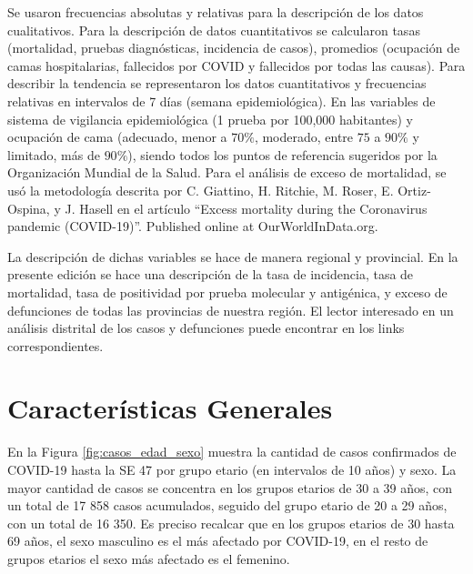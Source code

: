 \documentclass[12pt,a4paper,openany]{book}
\begin{document}
	Se usaron frecuencias absolutas y relativas para la descripción de los datos cualitativos. Para la descripción de datos cuantitativos se calcularon tasas (mortalidad, pruebas diagnósticas, incidencia de casos), promedios (ocupación de camas hospitalarias, fallecidos por COVID y fallecidos por todas las causas). Para describir la tendencia se representaron los datos cuantitativos y frecuencias relativas en intervalos de 7 días (semana epidemiológica). En las variables de sistema de vigilancia epidemiológica (1 prueba por 100,000 habitantes) y ocupación de cama (adecuado, menor a $70\%$, moderado, entre $75$ a $90\%$ y limitado, más de $90\%$), siendo todos los puntos de referencia sugeridos por la Organización Mundial de la Salud. Para el análisis de exceso de mortalidad, se usó la metodología descrita por C. Giattino, H. Ritchie, M. Roser, E. Ortiz-Ospina, y J. Hasell en el artículo ``Excess mortality during the Coronavirus pandemic (COVID-19)''. Published online at OurWorldInData.org.
	
	La descripción de dichas variables se hace de manera regional y provincial. En la presente edición se hace una descripción de la tasa de incidencia, tasa de mortalidad, tasa de positividad por prueba molecular y antigénica, y exceso de defunciones de todas las provincias de nuestra región. El lector interesado en un análisis distrital de los casos y defunciones puede encontrar en los links correspondientes.
	 
	
	\clearpage	
	\section*{Características Generales}
	
	
	
 	\noindent En la Figura \ref{fig:casos_edad_sexo} muestra la cantidad de casos confirmados de COVID-19 hasta la SE 47 por grupo etario (en intervalos de 10 años) y sexo. La mayor cantidad de casos se concentra en los grupos etarios de 30 a 39 años, con un total de 17 858 casos acumulados, seguido del grupo etario de 20 a 29 años, con un total de 16 350. Es preciso recalcar que en los grupos etarios de 30 hasta 69 años, el sexo masculino es el más afectado por COVID-19, en el resto de grupos etarios el sexo más afectado es el femenino. 
 	
\end{document}

